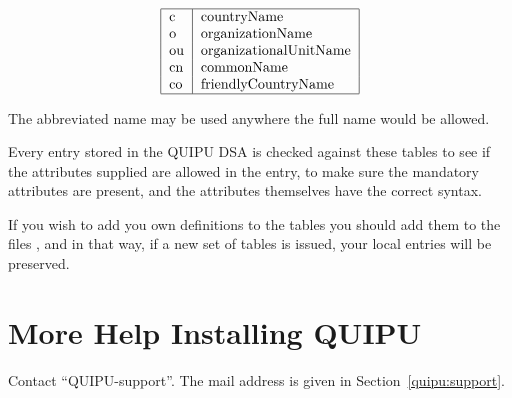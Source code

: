 \[\begin{tabular}{|l|l|}
\hline
c & countryName \\
o & organizationName \\
ou & organizationalUnitName \\
cn & commonName \\
co & friendlyCountryName \\
\hline
\end{tabular}\]

The abbreviated name may be used anywhere the full name would be allowed.


Every entry stored in the QUIPU DSA is checked against these tables to see if
the attributes supplied are allowed in the entry, to make sure the mandatory
attributes are present, and the attributes themselves have the correct syntax.

If you wish to add you own definitions to the tables you should add them to
the files 
,
 and
in that way, if a new set of tables is issued, your local entries will be
preserved.

\section{More Help Installing QUIPU}
Contact ``QUIPU-support''.
The mail address is given in Section~\ref{quipu:support}.

